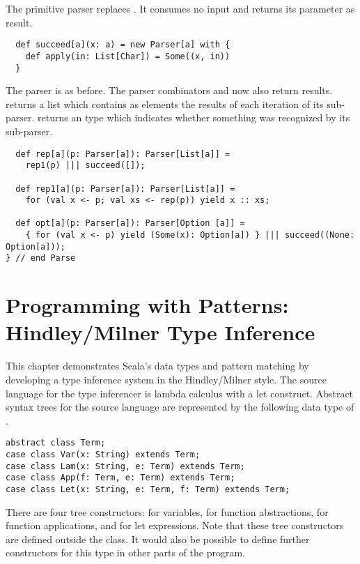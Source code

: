 \documentclass[11pt]{report}
\begin{document}
%
%
%
The primitive parser \verb@succeed@ replaces \verb@empty@. It consumes
no input and returns its parameter as result.
\begin{verbatim}
  def succeed[a](x: a) = new Parser[a] with {
    def apply(in: List[Char]) = Some((x, in))
  }
\end{verbatim}
The \verb@fail@ parser is as before.  The parser combinators
\verb@rep@ and \verb@opt@ now also return results. \verb@rep@ returns
a list which contains as elements the results of each iteration of its
sub-parser. \verb@opt@ returns an
\verb@Option@ type which indicates whether something was recognized by
its sub-parser.
\begin{verbatim}
  def rep[a](p: Parser[a]): Parser[List[a]] =
    rep1(p) ||| succeed([]);

  def rep1[a](p: Parser[a]): Parser[List[a]] =
    for (val x <- p; val xs <- rep(p)) yield x :: xs;

  def opt[a](p: Parser[a]): Parser[Option [a]] =
    { for (val x <- p) yield (Some(x): Option[a]) } ||| succeed((None: Option[a]));
} // end Parse
\end{verbatim}

\chapter{\label{sec:hm}Programming with Patterns: Hindley/Milner Type Inference}

This chapter demonstrates Scala's data types and pattern matching by
developing a type inference system in the Hindley/Milner style. The
source language for the type inferencer is lambda calculus with a let
construct. Abstract syntax trees for the source language are
represented by the following data type of \verb@Terms@.
\begin{verbatim}
abstract class Term;
case class Var(x: String) extends Term;
case class Lam(x: String, e: Term) extends Term;
case class App(f: Term, e: Term) extends Term;
case class Let(x: String, e: Term, f: Term) extends Term;
\end{verbatim}
There are four tree constructors: \verb@Var@ for variables, \verb@Lam@
for function abstractions, \verb@App@ for function applications, and
\verb@Let@ for let expressions. Note that these tree constructors are
defined outside the \verb@Term@ class. It would also be possible
to define further constructors for this type in other parts of the
program.
\end{document}
